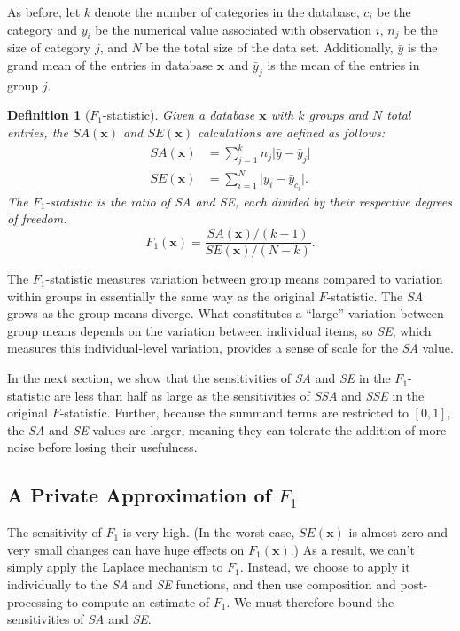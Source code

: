 \documentclass[USenglish,oneside]{article}
\newcounter{ab}
\newcounter{ar}
\newcounter{igh}
\newcounter{ms}
\newtheorem{definition}{Definition}
\newcommand{\dbsize}{\ensuremath{N}\xspace}
\renewcommand{\k}{\ensuremath{k}\xspace}
\newcommand{\sse}{\textit{SSE}\xspace}
\newcommand{\ssa}{\textit{SSA}\xspace}
\newcommand{\se}{\textit{SE}\xspace}
\newcommand{\sa}{\textit{SA}\xspace}
\newcommand{\x}{\ensuremath{\mathbf{x}}\xspace}
\begin{document}
As before, let \k denote the number of categories in the database, $c_i$ be the category and $y_i$ be the numerical value associated with observation $i$, $n_j$ be the size of category $j$, and $N$ be the total size of the data set. Additionally, $\bar{y}$ is the grand mean of the entries in database \x and $\bar{y}_j$ is the mean of the entries in group $j$. 
\begin{definition}[$F_1$-statistic]\label{def:f1stat}
Given a database \x with $k$ groups and \dbsize total entries, the $\sa(\x)$ and $\se(\x)$ calculations are defined as follows:
\begin{align*}
\sa(\x)  &= \sum_{j = 1}^{k} n_{j} \lvert \bar{y} - \bar{y}_{j} \rvert \\
\se(\x) &= \sum_{i=1}^N \lvert y_{i} - \bar{y}_{c_i} \rvert.
\end{align*}
The $F_1$-statistic is the ratio of \sa and \se, each divided by their respective degrees of freedom. 
\begin{equation*}
F_1(\x) = \frac{\sa(\x)/(k-1)}{\se(\x)/(\dbsize-k)}.
\end{equation*}
\end{definition}

The $F_1$-statistic measures variation between group means compared to variation within groups in essentially the same way as the original $F$-statistic. The \sa grows as the group means diverge.  What constitutes a ``large'' variation between group means depends on the variation between individual items, so \se, which measures this individual-level variation, provides a sense of scale for the \sa value.


In the next section, we show that the sensitivities of \sa and \se in the $F_1$-statistic are less than half as large as the sensitivities of \ssa and \sse in the original $F$-statistic. Further, because the summand terms are restricted to $[0,1]$, the \sa and \se values are larger, meaning they can tolerate the addition of more noise before losing their usefulness.

\subsection{A Private Approximation of $F_1$}\label{subsec:privf1}

The sensitivity of $F_1$ is very high.  (In the worst case, $\se(\x)$ is almost zero and very small changes can have huge effects on $F_1(\x)$.)  As a result, we can't simply apply the Laplace mechanism to $F_1$.  Instead, we choose to apply it individually to the \sa and \se functions, and then use composition and post-processing to compute an estimate of $F_1$.  We must therefore bound the sensitivities of \sa and \se.
\end{document}
